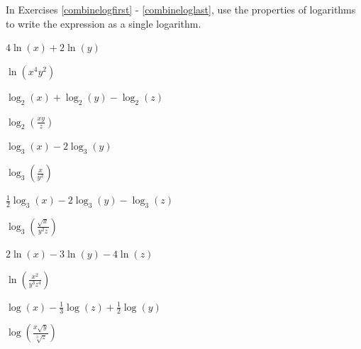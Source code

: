 \documentclass{ximera}
\begin{document}
\begin{question}
    
In Exercises \ref{combinelogfirst} - \ref{combineloglast}, use the properties of logarithms to write the expression as a single logarithm.

\begin{problem}\label{combinelogfirst}
     $4\ln(x) + 2\ln(y)$ 

     \begin{solution}
         $\ln(x^{4}y^{2})$
     \end{solution}
\end{problem}

\begin{problem}
    $\log_{2}(x) + \log_{2}(y) - \log_{2}(z)$

\begin{solution}
$\log_{2}\left(\frac{xy}{z}\right)$
\end{solution}
\end{problem}

\begin{problem}
    $\log_{3}(x) - 2 \log_{3}(y)$

    \begin{solution}
        $\log_{3} \left( \frac{x}{y^2} \right)$
    \end{solution}
\end{problem}

\begin{problem}
    $\frac{1}{2}\log_{3}(x) - 2\log_{3}(y) - \log_{3}(z)$

\begin{solution}
$\log_{3}\left(\frac{\sqrt{x}}{y^{2}z}\right)$
\end{solution}
\end{problem}

\begin{problem}
    $2 \ln(x) -3 \ln(y) - 4\ln(z)$

    \begin{solution}
        $\ln\left( \frac{x^2}{y^3z^4} \right)$
    \end{solution}
\end{problem}

\begin{problem}
    $\log(x) - \frac{1}{3} \log(z) + \frac{1}{2} \log(y)$

\begin{solution}
$\log\left(\frac{x \sqrt{y}}{\sqrt[3]{z}}  \right)$
\end{solution}
\end{problem}


\end{question}
\end{document}
